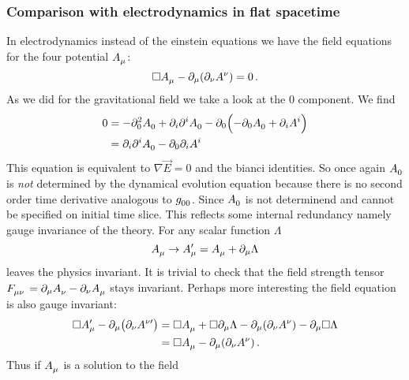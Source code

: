 \subsubsection{Comparison with electrodynamics in flat spacetime}
In electrodynamics instead of the einstein equations we have the field equations
for the four potential $\tensor{A}{_\mu}$:
\begin{equation}
\square\tensor{A}{_\mu}-\partial_\mu\left(\partial_\nu\tensor{A}{^\nu}
\right)=0\,.
\end{equation}
As we did for the gravitational field we take a look
at the 0 component. We find
\begin{equation}
\begin{split}
0&=-\partial_0^2\tensor{A}{_0}+\partial_i\partial^i\tensor{A}{_0}
-\partial_0\left(-\partial_0\tensor{A}{_0}+\partial_iA^i\right)\\
&= \partial_i\partial^i\tensor{A}{_0}-\partial_0\partial_iA^i
\end{split}
\end{equation}
This equation is equivalent to $\nabla\vec{E}=0$ and the bianci identities.
So once again $\tensor{A}{_0}$ is \emph{not} determined by the dynamical
evolution equation because there is no second order time derivative analogous to
$\tensor{g}{_0_0}$. Since $\tensor{A}{_0}$ is not determinend and cannot be
specified on initial time slice. This reflects some internal redundancy namely
gauge invariance of the theory. For any scalar function $\Lambda$
\begin{equation}
\tensor{A}{_\mu}\to\tensor*{A}{*_\mu^\prime}=
\tensor{A}{_\mu}+\partial_\mu\Lambda
\end{equation}
leaves the physics invariant. It is trivial to check that
the field strength tensor $\tensor{F}{_\mu_\nu}=\partial_\mu
\tensor{A}{_\nu}-\partial_\nu\tensor{A}{_\mu}$ stays invariant. Perhaps more
interesting the field equation is also gauge invariant:
\begin{equation}
\begin{split}
\square\tensor*{A}{*_\mu^\prime}-\partial_\mu\left(\partial_\nu\tensor*{A}{*^\nu^\prime}
\right)
&=
\square\tensor{A}{_\mu}+\square\partial_\mu\Lambda-\partial_\mu\left(\partial_\nu\tensor{A}{^\nu}
\right)-\partial_\mu\square\Lambda\\
&=
\square\tensor{A}{_\mu}-\partial_\mu\left(\partial_\nu\tensor{A}{^\nu}
\right)\,.
\end{split}
\end{equation}
Thus if $\tensor{A}{_\mu}$ is a solution to the field
